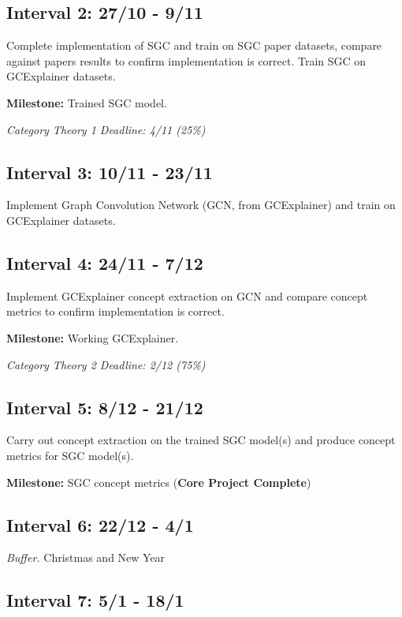 \subsection{Interval 2: 27/10 - 9/11}

Complete implementation of SGC and train on SGC paper datasets, compare against papers results to confirm implementation is correct. Train SGC on GCExplainer datasets.

\textbf{Milestone:} Trained SGC model.

\textit{Category Theory 1 Deadline: 4/11 (25\%)}

\subsection{Interval 3: 10/11 - 23/11}

Implement Graph Convolution Network (GCN, from GCExplainer) and train on GCExplainer datasets.

\subsection{Interval 4: 24/11 - 7/12}

Implement GCExplainer concept extraction on GCN and compare concept metrics to confirm implementation is correct.

\textbf{Milestone:} Working GCExplainer.

\textit{Category Theory 2 Deadline: 2/12 (75\%)}

\subsection{Interval 5: 8/12 - 21/12}

Carry out concept extraction on the trained SGC model(s) and produce concept metrics for SGC model(s).

\textbf{Milestone:} SGC concept metrics (\textbf{Core Project Complete})

\subsection{Interval 6: 22/12 - 4/1}

\textit{Buffer.} Christmas and New Year

\subsection{Interval 7: 5/1 - 18/1}
\label{interval:extension}

